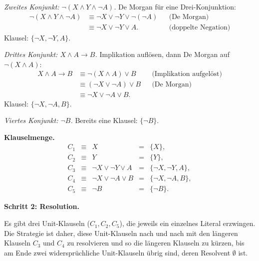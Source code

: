 \documentclass[a4paper,12pt]{article}
\begin{document}
\medskip
\emph{Zweites Konjunkt: $\neg(X \wedge Y \wedge \neg A)$.}
De Morgan f\"ur eine Drei-Konjunktion:
\begin{align*}
\neg(X \wedge Y \wedge \neg A)
&\equiv \neg X \vee \neg Y \vee \neg(\neg A)
&& \text{(De Morgan)} \\
&\equiv \neg X \vee \neg Y \vee A.
&& \text{(doppelte Negation)}
\end{align*}
Klausel: $\{\neg X, \neg Y, A\}$.

\medskip
\emph{Drittes Konjunkt: $X \wedge A \to B$.}
Implikation aufl\"osen, dann De Morgan auf $\neg(X \wedge A)$:
\begin{align*}
X \wedge A \to B
&\equiv \neg(X \wedge A) \vee B
&& \text{(Implikation aufgel\"ost)} \\
&\equiv (\neg X \vee \neg A) \vee B
&& \text{(De Morgan)} \\
&\equiv \neg X \vee \neg A \vee B.
\end{align*}
Klausel: $\{\neg X, \neg A, B\}$.

\medskip
\emph{Viertes Konjunkt: $\neg B$.}
Bereits eine Klausel: $\{\neg B\}$.

\medskip
\textbf{Klauselmenge.}
\[
\begin{array}{rclcl}
C_1 &\equiv& X                          &=& \{X\},\\
C_2 &\equiv& Y                          &=& \{Y\},\\
C_3 &\equiv& \neg X \vee \neg Y \vee A  &=& \{\neg X, \neg Y, A\},\\
C_4 &\equiv& \neg X \vee \neg A \vee B  &=& \{\neg X, \neg A, B\},\\
C_5 &\equiv& \neg B                     &=& \{\neg B\}.
\end{array}
\]

\bigskip
\textbf{Schritt 2: Resolution.}

Es gibt drei Unit-Klauseln ($C_1, C_2, C_5$), die jeweils ein einzelnes
Literal erzwingen. Die Strategie ist daher, diese Unit-Klauseln nach und
nach mit den l\"angeren Klauseln $C_3$ und $C_4$ zu resolvieren und so die
l\"angeren Klauseln zu k\"urzen, bis am Ende zwei widerspr\"uchliche
Unit-Klauseln \"ubrig sind, deren Resolvent $\emptyset$ ist.
\end{document}
